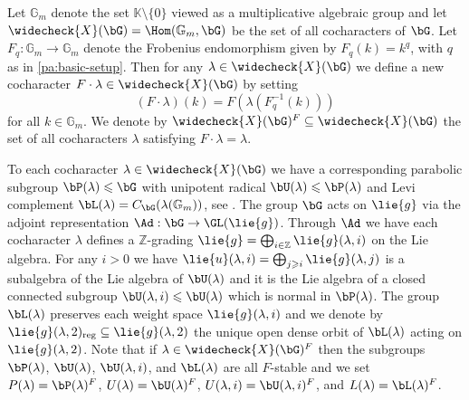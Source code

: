 \documentclass[eqthmnum, nocolour]{jt-calcs}
\begin{document}
\begin{pa}
Let $\mathbb{G}_m$ denote the set $\mathbb{K} \setminus \{0\}$ viewed as a multiplicative algebraic group and let $\widecheck{X}(\bG) = \Hom(\mathbb{G}_m,\bG)$ be the set of all cocharacters of $\bG$. Let $F_q : \mathbb{G}_m \to \mathbb{G}_m$ denote the Frobenius endomorphism given by $F_q(k) = k^q$, with $q$ as in \cref{pa:basic-setup}. Then for any $\lambda \in \widecheck{X}(\bG)$ we define a new cocharacter $F\cdot\lambda \in \widecheck{X}(\bG)$ by setting
\begin{equation*}
(F\cdot\lambda)(k) = F(\lambda(F_q^{-1}(k)))
\end{equation*}
for all $k \in \mathbb{G}_m$. We denote by $\widecheck{X}(\bG)^F \subseteq \widecheck{X}(\bG)$ the set of all cocharacters $\lambda$ satisfying $F\cdot\lambda = \lambda$.
\end{pa}

\begin{pa}
To each cocharacter $\lambda \in \widecheck{X}(\bG)$ we have a corresponding parabolic subgroup $\bP(\lambda) \leqslant \bG$ with unipotent radical $\bU(\lambda) \leqslant \bP(\lambda)$ and Levi complement $\bL(\lambda) = C_{\bG}(\lambda(\mathbb{G}_m))$, see \cite[3.2.15, 8.4.5]{springer:2009:linear-algebraic-groups}. The group $\bG$ acts on $\lie{g}$ via the adjoint representation $\Ad : \bG \to \GL(\lie{g})$. Through $\Ad$ we have each cocharacter $\lambda$ defines a $\mathbb{Z}$-grading $\lie{g} = \bigoplus_{i \in \mathbb{Z}} \lie{g}(\lambda,i)$ on the Lie algebra. For any $i > 0$ we have $\lie{u}(\lambda,i) = \bigoplus_{j \geqslant i} \lie{g}(\lambda,j)$ is a subalgebra of the Lie algebra of $\bU(\lambda)$ and it is the Lie algebra of a closed connected subgroup $\bU(\lambda,i) \leqslant \bU(\lambda)$ which is normal in $\bP(\lambda)$. The group $\bL(\lambda)$ preserves each weight space $\lie{g}(\lambda,i)$ and we denote by $\lie{g}(\lambda,2)_{\mathrm{reg}} \subseteq \lie{g}(\lambda,2)$ the unique open dense orbit of $\bL(\lambda)$ acting on $\lie{g}(\lambda,2)$. Note that if $\lambda \in \widecheck{X}(\bG)^F$ then the subgroups $\bP(\lambda)$, $\bU(\lambda)$, $\bU(\lambda,i)$, and $\bL(\lambda)$ are all $F$-stable and we set $P(\lambda) = \bP(\lambda)^F$, $U(\lambda) = \bU(\lambda)^F$, $U(\lambda,i) = \bU(\lambda,i)^F$, and $L(\lambda) = \bL(\lambda)^F$.
\end{pa}
\end{document}
